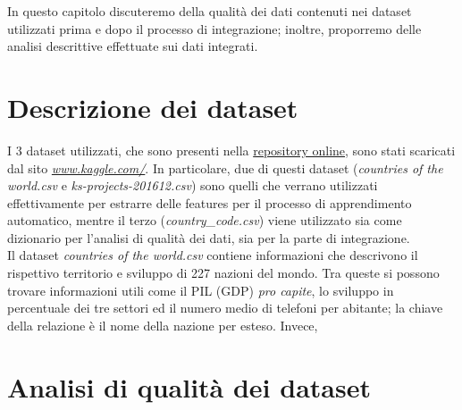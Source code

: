In questo capitolo discuteremo della qualità dei dati contenuti nei dataset utilizzati prima e dopo il processo di integrazione; inoltre, proporremo delle analisi descrittive effettuate sui dati integrati. 
\section{Descrizione dei dataset}
I 3 dataset utilizzati, che sono presenti nella \href{https://gitlab.com/Daniele-Papetti/kickstarterprediction}{repository online}, sono stati scaricati dal sito \href{https://www.kaggle.com/}{\emph{www.kaggle.com/}}.
In particolare, due di questi dataset (\textit{countries of the world.csv} e \textit{ks-projects-201612.csv}) sono quelli che verrano utilizzati effettivamente per estrarre delle features per il processo di apprendimento automatico, mentre il terzo (\textit{country\_code.csv}) viene utilizzato sia come dizionario per l'analisi di qualità dei dati, sia per la parte di integrazione.\\
Il dataset \textit{countries of the world.csv} contiene informazioni che descrivono il rispettivo territorio e sviluppo di 227 nazioni del mondo.
Tra queste si possono trovare informazioni utili come il PIL (GDP) \textit{pro capite}, lo sviluppo in percentuale dei tre settori ed il numero medio di telefoni per abitante; la chiave della relazione è il nome della nazione per esteso.
Invece, 
\section{Analisi di qualità dei dataset}
